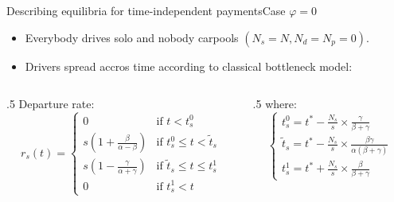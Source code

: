 \documentclass[english, 9pt, aspectratio=169]{beamer}
\begin{document}
\begin{frame}{Describing equilibria for time-independent payments}{Case $\varphi = 0$}

\begin{itemize}
    \item Everybody drives solo and nobody carpools $(N_s=N, N_d = N_p = 0)$.
    \item Drivers spread accros time according to classical bottleneck model:
\end{itemize}

\vfill
\hrulefill
\vfill

\begin{columns}

\begin{column}{.5\textwidth}
Departure rate:
\begin{equation*}
\label{eq_rs}
r_s(t) = \left\{
\begin{array}{lr}
    0 & \text{if } t<t_s^0\\
    s\left( 1 + \frac{\beta}{\alpha - \beta} \right) & \text{if } t_s^0 \leq t < \tilde{t}_s\\
    s\left( 1 - \frac{\gamma}{\alpha + \gamma} \right) & \text{if } \tilde{t}_s \leq t \leq t_s^1\\
    0 & \text{if } t_s^1 < t
\end{array}
\right.
\end{equation*}
\end{column}

\begin{column}{.5\textwidth}
where:
\begin{equation*}
\label{eq_ts}
\left\{
\begin{array}{l}
    t_s^0 = t^* - \frac{N_s}{s} \times \frac{\gamma}{\beta + \gamma}\\
    \tilde{t}_s = t^* - \frac{N_s}{s} \times \frac{\beta \gamma}{\alpha(\beta + \gamma)}\\
    t_s^1 = t^* + \frac{N_s}{s} \times \frac{\beta}{\beta + \gamma}
\end{array}
\right.
\end{equation*}
\end{column}
\end{columns}
\end{frame}
\end{document}

